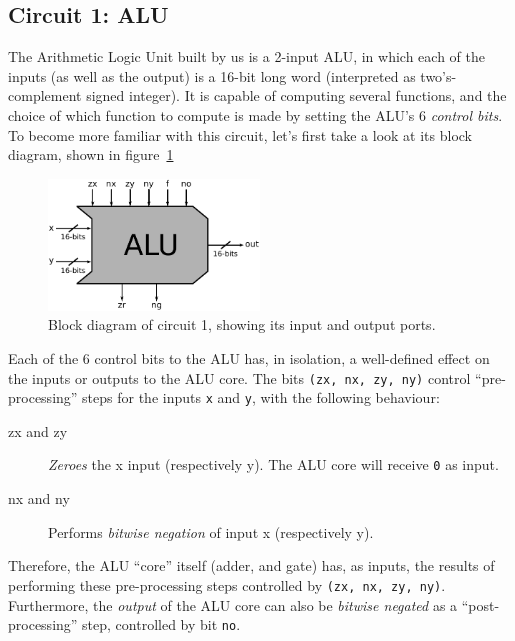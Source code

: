     \subsection{Circuit 1: ALU}
    \label{subsec:circuit-alu}

        The Arithmetic Logic Unit built by us is a 2-input ALU, in which each of the inputs (as well
        as the output) is a 16-bit long word (interpreted as two's-complement signed integer). It is
        capable of computing several functions, and the choice of which function to compute is made
        by setting the ALU's 6 \emph{control bits}. To become more familiar with this circuit, let's
        first take a look at its block diagram, shown in figure~\ref{fig:alu-block}

        \begin{figure}[h!]
            \centerline{\includegraphics[width=0.5\textwidth]{imgs/alu-block.pdf}}
            \caption{Block diagram of circuit 1, showing its input and output ports.
                \label{fig:alu-block}}
        \end{figure}

        Each of the 6 control bits to the ALU has, in isolation, a well-defined effect on the inputs
        or outputs to the ALU core. The bits \texttt{(zx, nx, zy, ny)} control ``pre-processing''
        steps for the inputs \texttt{x} and \texttt{y}, with the following behaviour:

        \begin{description}
            \item[zx and zy] \emph{Zeroes} the x input (respectively y). The ALU core will receive
                \texttt{0} as input.

            \item[nx and ny] Performs \emph{bitwise negation} of input x (respectively y).
        \end{description}

        Therefore, the ALU ``core'' itself (adder, and gate) has, as inputs, the results of
        performing these pre-processing steps controlled by \texttt{(zx, nx, zy, ny)}.  Furthermore,
        the \emph{output} of the ALU core can also be \emph{bitwise negated} as a
        ``post-processing'' step, controlled by bit \texttt{no}.

